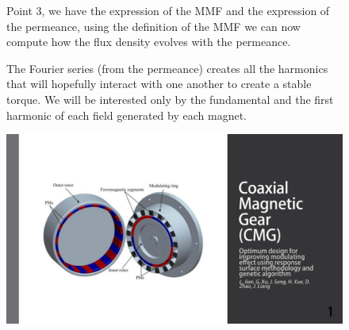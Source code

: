 \begin{figure}[H]
    \begin{minipage}{.45\linewidth}
     Point 3, we have the expression of the MMF and the expression of the permeance, using the definition of the MMF we can now compute how the flux density evolves with the permeance. 
     
     The Fourier series (from the permeance) creates all the harmonics that will hopefully interact with one another to create a stable torque. We will be interested only by the fundamental and the first harmonic of each field generated by each magnet.
     
    \end{minipage}
    \hfill%
    \begin{minipage}[c]{.45\linewidth}
        \centering
        \includegraphics[page={23},width=\textwidth]{LELEC2311.allow.pdf}
    \end{minipage}
\end{figure}

